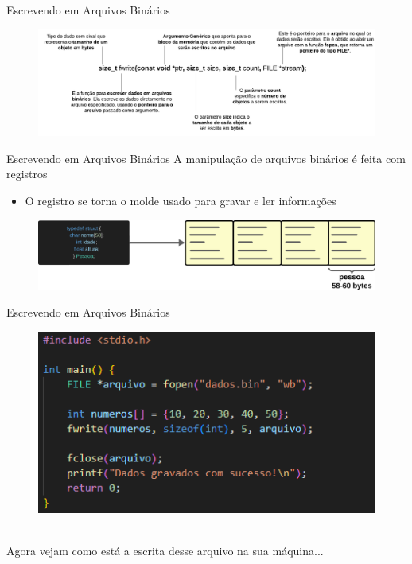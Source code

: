 \begin{frame}{Escrevendo em Arquivos Binários}
\begin{figure}
    \centering
    \includegraphics[width=1\linewidth]{figuras/Declarabin.png}
\end{figure}
\end{frame}

\begin{frame}{Escrevendo em Arquivos Binários}
    A manipulação de arquivos binários é feita com registros
\begin{itemize}
    \item O registro se torna o molde usado para gravar e ler informações
\end{itemize}
\begin{figure}
    \centering
    \includegraphics[width=0.75\linewidth]{figuras/binRegs.png}
\end{figure}
\end{frame}


\begin{frame}{Escrevendo em Arquivos Binários}
\begin{figure}
    \centering
    \includegraphics[width=0.75\linewidth]{figuras/binWrite.png}
\end{figure}
    \\Agora vejam como está a escrita desse arquivo na sua máquina...
\end{frame}



